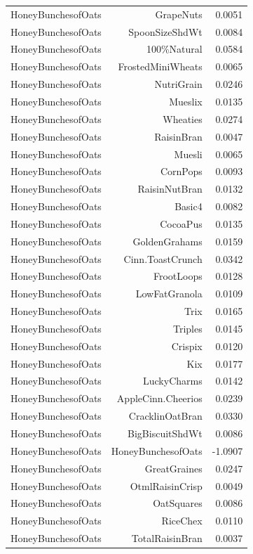 \begin{longtable}{@{}lrr@{}}
HoneyBunchesofOats & GrapeNuts & 0.0051 \\
HoneyBunchesofOats & SpoonSizeShdWt & 0.0084 \\
HoneyBunchesofOats & 100\%Natural & 0.0584 \\
HoneyBunchesofOats & FrostedMiniWheats & 0.0065 \\
HoneyBunchesofOats & NutriGrain & 0.0246 \\
HoneyBunchesofOats & Mueslix & 0.0135 \\
HoneyBunchesofOats & Wheaties & 0.0274 \\
HoneyBunchesofOats & RaisinBran & 0.0047 \\
HoneyBunchesofOats & Muesli & 0.0065 \\
HoneyBunchesofOats & CornPops & 0.0093 \\
HoneyBunchesofOats & RaisinNutBran & 0.0132 \\
HoneyBunchesofOats & Basic4 & 0.0082 \\
HoneyBunchesofOats & CocoaPus & 0.0135 \\
HoneyBunchesofOats & GoldenGrahams & 0.0159 \\
HoneyBunchesofOats & Cinn.ToastCrunch & 0.0342 \\
HoneyBunchesofOats & FrootLoops & 0.0128 \\
HoneyBunchesofOats & LowFatGranola & 0.0109 \\
HoneyBunchesofOats & Trix & 0.0165 \\
HoneyBunchesofOats & Triples & 0.0145 \\
HoneyBunchesofOats & Crispix & 0.0120 \\
HoneyBunchesofOats & Kix & 0.0177 \\
HoneyBunchesofOats & LuckyCharms & 0.0142 \\
HoneyBunchesofOats & AppleCinn.Cheerios & 0.0239 \\
HoneyBunchesofOats & CracklinOatBran & 0.0330 \\
HoneyBunchesofOats & BigBiscuitShdWt & 0.0086 \\
HoneyBunchesofOats & HoneyBunchesofOats & -1.0907 \\
HoneyBunchesofOats & GreatGraines & 0.0247 \\
HoneyBunchesofOats & OtmlRaisinCrisp & 0.0049 \\
HoneyBunchesofOats & OatSquares & 0.0086 \\
HoneyBunchesofOats & RiceChex & 0.0110 \\
HoneyBunchesofOats & TotalRaisinBran & 0.0037 \\

\end{longtable}
